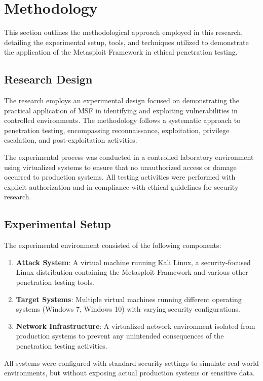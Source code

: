 \documentclass[journal,twoside]{IEEEtran}
\begin{document}
\section{Methodology}
This section outlines the methodological approach employed in this research, detailing the experimental setup, tools, and techniques utilized to demonstrate the application of the Metasploit Framework in ethical penetration testing.

\subsection{Research Design}
The research employs an experimental design focused on demonstrating the practical application of MSF in identifying and exploiting vulnerabilities in controlled environments. The methodology follows a systematic approach to penetration testing, encompassing reconnaissance, exploitation, privilege escalation, and post-exploitation activities.

The experimental process was conducted in a controlled laboratory environment using virtualized systems to ensure that no unauthorized access or damage occurred to production systems. All testing activities were performed with explicit authorization and in compliance with ethical guidelines for security research.

\subsection{Experimental Setup}
The experimental environment consisted of the following components:

\begin{enumerate}
    \item \textbf{Attack System}: A virtual machine running Kali Linux, a security-focused Linux distribution containing the Metasploit Framework and various other penetration testing tools.
    \item \textbf{Target Systems}: Multiple virtual machines running different operating systems (Windows 7, Windows 10) with varying security configurations.
    \item \textbf{Network Infrastructure}: A virtualized network environment isolated from production systems to prevent any unintended consequences of the penetration testing activities.
\end{enumerate}

All systems were configured with standard security settings to simulate real-world environments, but without exposing actual production systems or sensitive data.
\end{document}
